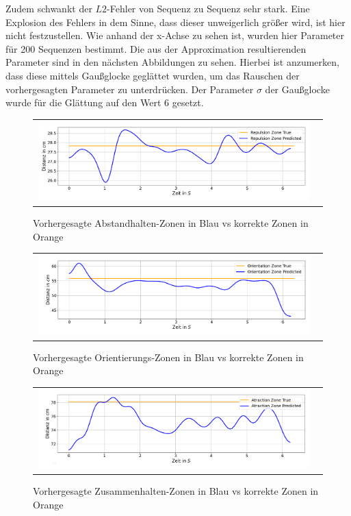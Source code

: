 Zudem schwankt der $L2$-Fehler von Sequenz zu Sequenz sehr stark.
Eine Explosion des Fehlers in dem Sinne, dass dieser unweigerlich größer wird, ist hier nicht festzustellen.
Wie anhand der x-Achse zu sehen ist, wurden hier Parameter für 200 Sequenzen bestimmt.
Die aus der Approximation resultierenden Parameter sind in den nächsten Abbildungen zu sehen.
Hierbei ist anzumerken, dass diese mittels Gaußglocke geglättet wurden, um das Rauschen der vorhergesagten Parameter zu unterdrücken. Der Parameter $\sigma$ der Gaußglocke wurde für die Glättung auf den Wert 6 gesetzt.

\begin{figure}[H]
\centering
\begin{tabular}{cc}
\includegraphics[width=1.0\textwidth]{figures/Experimente/10Fisch/RepulsionZone.png} 
\end{tabular}
\caption{Vorhergesagte Abstandhalten-Zonen in Blau vs korrekte Zonen in Orange  \label{fig:RZonePrediction}}
\end{figure}

\begin{figure}[H]
\centering
\begin{tabular}{cc}
\includegraphics[width=1.0\textwidth]{figures/Experimente/10Fisch/OrientationZone.png} 
\end{tabular}
\caption{Vorhergesagte Orientierungs-Zonen in Blau vs korrekte Zonen in Orange  \label{fig:OZonePrediction}}
\end{figure}

\begin{figure}[H]
\centering
\begin{tabular}{cc}
\includegraphics[width=1.0\textwidth]{figures/Experimente/10Fisch/AttractionZone.png} 
\end{tabular}
\caption{Vorhergesagte Zusammenhalten-Zonen in Blau vs korrekte Zonen in Orange  \label{fig:AZonePrediction}}
\end{figure}

